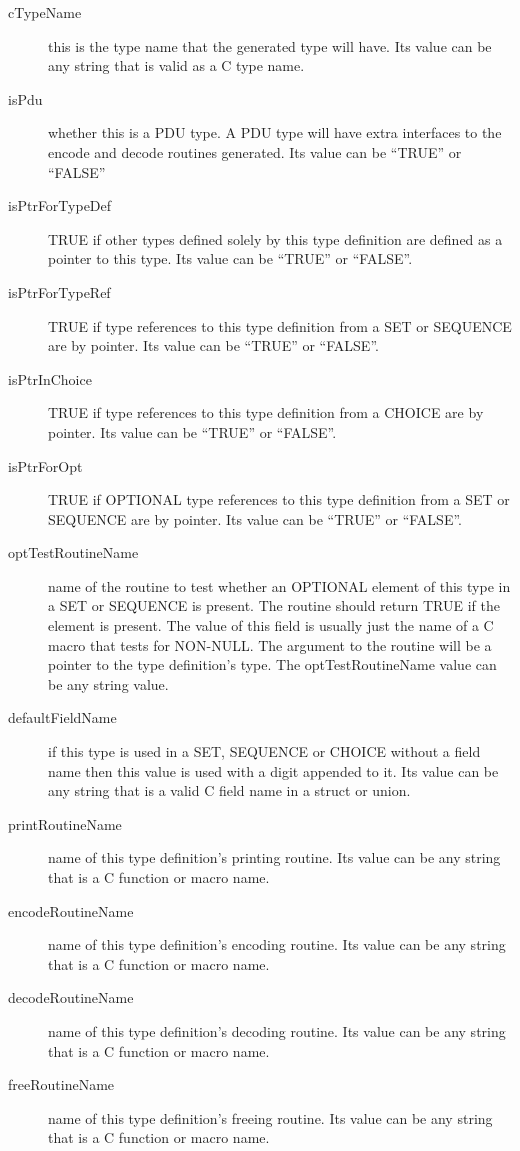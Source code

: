 \begin{description}
\item[cTypeName] { this is the type name that the generated type will
have. Its value can be any string that is valid as a C type name.}

\item[isPdu]     { whether this is a PDU type.  A PDU type will have
extra interfaces to the encode and decode routines generated. Its
value can be ``TRUE'' or ``FALSE''}

\item[isPtrForTypeDef] { TRUE if other types defined solely by this type
definition are defined as a pointer to this type. Its
value can be ``TRUE'' or ``FALSE''.}

\item[isPtrForTypeRef]{ TRUE if type references to this type
definition from a SET or SEQUENCE are by pointer. Its
value can be ``TRUE'' or ``FALSE''.}

\item[isPtrInChoice] {TRUE if type references to this type definition
from a CHOICE are by pointer. Its value can be ``TRUE'' or ``FALSE''.}


\item[isPtrForOpt]  { TRUE if OPTIONAL type references to this type
definition from a SET or SEQUENCE are by pointer. Its value can be
``TRUE'' or ``FALSE''.}

\item[optTestRoutineName] {name of the routine to test whether an
OPTIONAL element of this type in a SET or SEQUENCE is present. The
routine should return TRUE if the element is present.  The value of
this field is usually just the name of a C macro that tests for NON-NULL\@.
The argument to the routine will be a pointer to the type definition's
type.  The optTestRoutineName value can be any string value.}

\item[defaultFieldName] { if this type is used in a SET, SEQUENCE or
CHOICE without a field name then this value is used with a digit
appended to it.  Its value can be any string that is a valid C field
name in a struct or union.}
\item[printRoutineName] { name of this type definition's printing
routine.  Its value can be any string that is a C function or
macro name.}
\item[encodeRoutineName]{ name of this type definition's encoding
routine. Its value can be any string that is a C function or
macro name.}
\item[decodeRoutineName]{ name of this type definition's decoding
routine. Its value can be any string that is a C function or
macro name.}
\item[freeRoutineName]  { name of this type definition's freeing
routine. Its value can be any string that is a C function or
macro name.}


\end{description}
